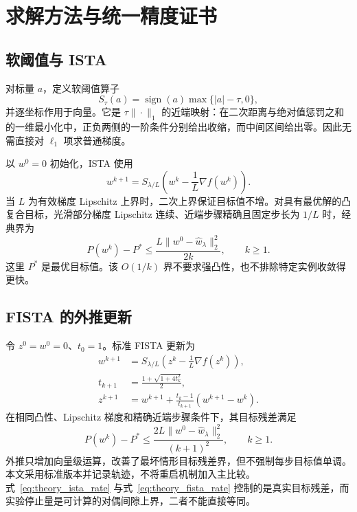 \section{求解方法与统一精度证书}
\subsection{软阈值与 ISTA}
对标量 $a$，定义软阈值算子
\begin{equation}
  S_\tau(a)=\operatorname{sign}(a)\max\{|a|-\tau,0\},
  \label{eq:theory_soft}
\end{equation}
并逐坐标作用于向量。它是 $\tau\|\cdot\|_1$ 的近端映射：在二次距离与绝对值惩罚之和的一维最小化中，正负两侧的一阶条件分别给出收缩，而中间区间给出零。因此无需直接对 $\ell_1$ 项求普通梯度。

以 $w^0=0$ 初始化，ISTA 使用
\begin{equation}
  w^{k+1}=S_{\lambda/L}
  \left(w^k-\frac{1}{L}\nabla f(w^k)\right).
  \label{eq:theory_ista}
\end{equation}
当 $L$ 为有效梯度 Lipschitz 上界时，二次上界保证目标值不增。对具有最优解的凸复合目标，光滑部分梯度 Lipschitz 连续、近端步骤精确且固定步长为 $1/L$ 时，经典界为\cite{beck2009}
\begin{equation}
  P(w^k)-P^*\leq
  \frac{L\|w^0-\widehat w_\lambda\|_2^2}{2k},
  \qquad k\geq1.
  \label{eq:theory_ista_rate}
\end{equation}
这里 $P^*$ 是最优目标值。该 $O(1/k)$ 界不要求强凸性，也不排除特定实例收敛得更快。

\subsection{FISTA 的外推更新}
令 $z^0=w^0=0$、$t_0=1$。标准 FISTA 更新为
\begin{align}
  w^{k+1}&=S_{\lambda/L}
    \left(z^k-\frac{1}{L}\nabla f(z^k)\right),\nonumber\\
  t_{k+1}&=\frac{1+\sqrt{1+4t_k^2}}{2},\nonumber\\
  z^{k+1}&=w^{k+1}
    +\frac{t_k-1}{t_{k+1}}(w^{k+1}-w^k).
  \label{eq:theory_fista}
\end{align}
在相同凸性、Lipschitz 梯度和精确近端步骤条件下，其目标残差满足\cite{beck2009}
\begin{equation}
  P(w^k)-P^*\leq
  \frac{2L\|w^0-\widehat w_\lambda\|_2^2}{(k+1)^2},
  \qquad k\geq1.
  \label{eq:theory_fista_rate}
\end{equation}
外推只增加向量级运算，改善了最坏情形目标残差界，但不强制每步目标值单调。本文采用标准版本并记录轨迹，不将重启机制加入主比较。式~\eqref{eq:theory_ista_rate} 与式~\eqref{eq:theory_fista_rate} 控制的是真实目标残差，而实验停止量是可计算的对偶间隙上界，二者不能直接等同。

